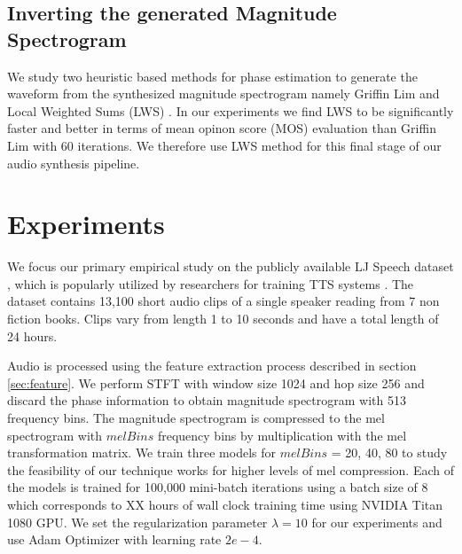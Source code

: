 \documentclass[a4paper]{article}
\begin{document}
\subsection{Inverting the generated Magnitude Spectrogram}
We study two heuristic based methods for phase estimation to generate the waveform from the synthesized magnitude spectrogram namely Griffin Lim \cite{griffinlim} and Local Weighted Sums (LWS) \cite{lws}. In our experiments we find LWS \cite{lws} to be significantly faster and better in terms of mean opinon score (MOS) evaluation than Griffin Lim with 60 iterations. 
We therefore use LWS method for this final stage of our audio synthesis pipeline.




\section{Experiments}
\label{sec:experiments}
We focus our primary empirical study on the publicly available LJ Speech dataset \cite{ljspeech}, which is popularly utilized by researchers for training TTS systems \cite{waveglow,r9y9}. The dataset contains 13,100 short audio clips of a single speaker reading from 7 non fiction books. Clips vary from length 1 to 10 seconds and have a total length of 24 hours.

Audio is processed using the feature extraction process described in section \ref{sec:feature}. We perform STFT with window size 1024 and hop size 256 and discard the phase information to obtain magnitude spectrogram with 513 frequency bins. The magnitude spectrogram is compressed to the mel spectrogram with $melBins$ frequency bins by multiplication with the mel transformation matrix.  
We train three models for $\mathit{melBins}$ = 20, 40, 80 to study the feasibility of our technique works for higher levels of mel compression. Each of the models is trained for 100,000 mini-batch iterations using a batch size of 8 which corresponds to XX hours of wall clock training time using NVIDIA Titan 1080 GPU. We set the regularization parameter $\lambda = 10$ for our experiments and use Adam Optimizer with learning rate $2e-4$. 
\end{document}
